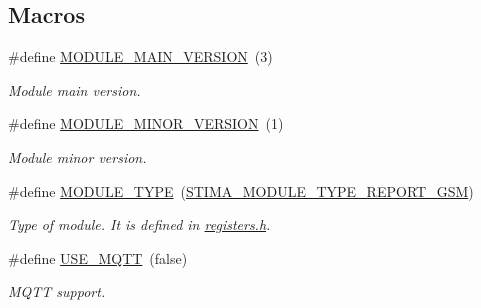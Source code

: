 \subsection*{Macros}
\begin{DoxyCompactItemize}
\item 
\mbox{\label{rmap-config_8h_a0d5c86ab9704d2fa4a6fe40bed8bfc59}} 
\#define \hyperlink{rmap-config_8h_a0d5c86ab9704d2fa4a6fe40bed8bfc59}{M\+O\+D\+U\+L\+E\+\_\+\+M\+A\+I\+N\+\_\+\+V\+E\+R\+S\+I\+ON}~(3)
\begin{DoxyCompactList}\small\item\em Module main version. \end{DoxyCompactList}\item 
\mbox{\label{rmap-config_8h_a2a4d13f49c683db07dcecd2379857d83}} 
\#define \hyperlink{rmap-config_8h_a2a4d13f49c683db07dcecd2379857d83}{M\+O\+D\+U\+L\+E\+\_\+\+M\+I\+N\+O\+R\+\_\+\+V\+E\+R\+S\+I\+ON}~(1)
\begin{DoxyCompactList}\small\item\em Module minor version. \end{DoxyCompactList}\item 
\mbox{\label{rmap-config_8h_a8c815d03b3fd3e18ca06f920a1eb4e8e}} 
\#define \hyperlink{rmap-config_8h_a8c815d03b3fd3e18ca06f920a1eb4e8e}{M\+O\+D\+U\+L\+E\+\_\+\+T\+Y\+PE}~(\hyperlink{stima__module_8h_aea131800c42cd2037b9a227f49d65872}{S\+T\+I\+M\+A\+\_\+\+M\+O\+D\+U\+L\+E\+\_\+\+T\+Y\+P\+E\+\_\+\+R\+E\+P\+O\+R\+T\+\_\+\+G\+SM})
\begin{DoxyCompactList}\small\item\em Type of module. It is defined in \hyperlink{registers_8h}{registers.\+h}. \end{DoxyCompactList}\item 
\mbox{\label{rmap-config_8h_a3c6bee2b593ec16dc4cf77ffcfd4cea8}} 
\#define \hyperlink{rmap-config_8h_a3c6bee2b593ec16dc4cf77ffcfd4cea8}{U\+S\+E\+\_\+\+M\+Q\+TT}~(false)
\begin{DoxyCompactList}\small\item\em M\+Q\+TT support. \end{DoxyCompactList}\item 
\mbox{\label{rmap-config_8h_ad1b880b20b32f399da65d86c5dd50cee}} 

\end{DoxyCompactItemize}
